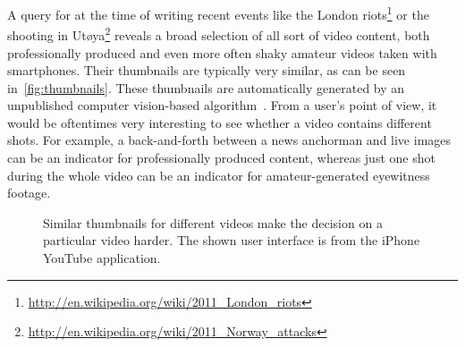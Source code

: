 \documentclass[runningheads,a4paper]{llncs}
\begin{document}
A query for at the time of writing recent events like the London riots\footnote{\url{http://en.wikipedia.org/wiki/2011_London_riots}} or the shooting in Ut\o ya\footnote{\url{http://en.wikipedia.org/wiki/2011_Norway_attacks}} reveals a broad selection of all sort of video content, both professionally produced and even more often shaky amateur videos taken with smartphones. Their thumbnails are typically very similar, as can be seen in~\autoref{fig:thumbnails}. These thumbnails are automatically generated by an unpublished computer vision-based algorithm~\cite{googleresearch}. From a user's point of view, it would be oftentimes very interesting to see whether a video contains different shots. For example, a back-and-forth between a news anchorman and live images can be an indicator for professionally  produced content, whereas just one shot during the whole video can be an indicator for amateur-generated eyewitness footage.

\begin{figure}[htb!]
  \begin{center}
\hspace{10pt}
  \caption{Similar thumbnails for different videos make the decision on a particular video harder. The shown user interface is from the iPhone YouTube application.}
  \label{fig:thumbnails}
  \end{center}  
\end{figure}
\end{document}
